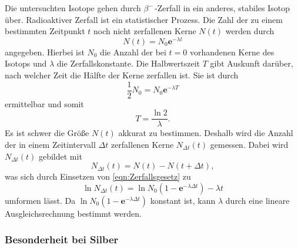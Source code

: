 Die untersuchten Isotope gehen durch $\beta^-\,$-Zerfall in ein anderes, stabiles Isotop über.
Radioaktiver Zerfall ist ein statistischer Prozess.
Die Zahl der zu einem bestimmten Zeitpunkt $t$ noch nicht zerfallenen Kerne $N(t)$ werden durch
\begin{equation}\label{eqn:Zerfallsgesetz}
    N(t) = N_0 \textbf{e}^{-\lambda t}
\end{equation}
angegeben. Hierbei ist $N_0$ die Anzahl der bei $t=0$ vorhandenen Kerne des Isotops und $\lambda$ die Zerfallskonstante.	
Die Halbwertszeit $T$ gibt Auskunft darüber, nach welcher Zeit die Hälfte der Kerne zerfallen ist.
Sie ist durch
\begin{equation*}
    \frac{1}{2}N_0 = N_0 \textbf{e}^{-\lambda T}
\end{equation*}
ermittelbar und somit 
\begin{equation*}
    T = \frac{\ln 2}{\lambda}.
\end{equation*}
Es ist schwer die Größe $N(t)$ akkurat zu bestimmen. 
Deshalb wird die Anzahl der in einem Zeitintervall $\Delta t$ zerfallenen Kerne $N_{\Delta t}(t)$ gemessen.
Dabei wird $N_{\Delta t}(t)$ gebildet mit
\begin{equation*}
    N_{\Delta t}(t) = N(t) - N(t + \Delta t),
\end{equation*}
was sich durch Einsetzen von \eqref{eqn:Zerfallsgesetz} zu
\begin{equation*}%
    \ln N_{\Delta t}(t) = \ln{N_0}\left(1 - \textbf{e}^{-\lambda\Delta t}\right) - \lambda t
\end{equation*}
umformen lässt.
Da $\ln N_0(1 - \textbf{e}^{-\lambda\Delta t})$ konstant ist, kann $\lambda$ durch eine lineare Ausgleichsrechnung bestimmt werden.

\subsubsection{Besonderheit bei Silber}
\label{subsubsec:Besonderheit bei Silber}

